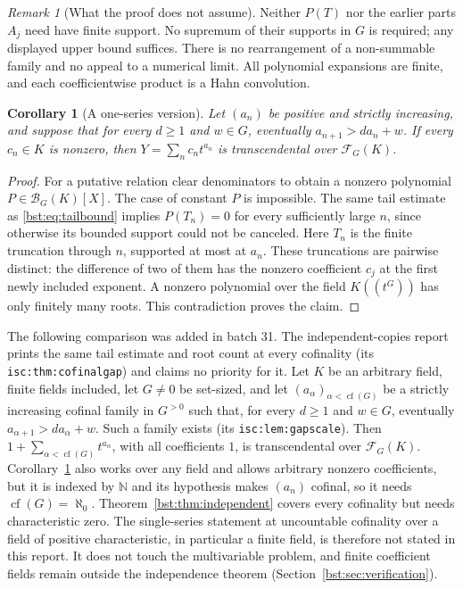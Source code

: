 \documentclass[11pt,letterpaper]{article}
\newtheorem{corollary}[theorem]{Corollary}
\theoremstyle{definition}
\theoremstyle{remark}
\newtheorem{remark}[theorem]{Remark}
\newcommand{\N}{\mathbb N}
\newcommand{\cof}{\operatorname{cf}}
\newcommand{\HH}[2]{#1((t^{#2}))}
\newcommand{\BB}[2]{\mathcal B_{#2}(#1)}
\newcommand{\FF}[2]{\mathcal F_{#2}(#1)}
\begin{document}
\begin{remark}[What the proof does not assume]
Neither $P(T)$ nor the earlier parts $A_j$ need have finite support.
No supremum of their supports in $G$ is required; any displayed upper bound
suffices. There is no rearrangement of a non-summable family and no appeal
to a numerical limit. All polynomial expansions are finite, and each
coefficientwise product is a Hahn convolution.
\end{remark}

\begin{corollary}[A one-series version]\label{bst:cor:onegap}
Let $(a_n)$ be positive and strictly increasing, and suppose that for every
$d\ge1$ and $w\in G$, eventually $a_{n+1}>d a_n+w$. If every $c_n\in K$
is nonzero, then $Y=\sum_n c_nt^{a_n}$ is transcendental over $\FF KG$.
\end{corollary}
\begin{proof}
For a putative relation clear denominators to obtain a nonzero polynomial
$P\in\BB KG[X]$. The case of constant $P$ is impossible. The same tail
estimate as \eqref{bst:eq:tailbound} implies $P(T_n)=0$ for every sufficiently
large $n$, since otherwise its bounded support could not be canceled.
Here $T_n$ is the finite truncation through $n$, supported at most at $a_n$.
These truncations are pairwise distinct: the difference of two of them
has the nonzero coefficient $c_j$ at the first newly included exponent.
A nonzero polynomial over the field $\HH KG$ has only finitely many roots. This contradiction proves the claim.
\end{proof}

The following comparison was added in batch 31. The independent-copies report
\cite{RepoIsc} prints the same tail estimate and root count at every cofinality
(its \texttt{isc:thm:cofinalgap}) and claims no priority for it. Let $K$ be an arbitrary field, finite fields
included, let $G\ne0$ be set-sized, and let $(a_\alpha)_{\alpha<\cof(G)}$ be a
strictly increasing cofinal family in $G^{>0}$ such that, for every $d\ge1$
and $w\in G$, eventually $a_{\alpha+1}>d a_\alpha+w$. Such a family exists
(its \texttt{isc:lem:gapscale}). Then $1+\sum_{\alpha<\cof(G)}t^{a_\alpha}$,
with all coefficients $1$, is transcendental over $\FF KG$.
Corollary~\ref{bst:cor:onegap} also works over any field and allows arbitrary
nonzero coefficients, but it is indexed by $\N$ and its hypothesis makes $(a_n)$
cofinal, so it needs $\cof(G)=\aleph_0$. Theorem~\ref{bst:thm:independent} covers
every cofinality but needs characteristic zero. The single-series statement at
uncountable cofinality over a field of positive characteristic, in particular a
finite field, is therefore not stated in this report. It does not touch the
multivariable problem, and finite coefficient fields remain outside the
independence theorem (Section~\ref{bst:sec:verification}).
\end{document}
